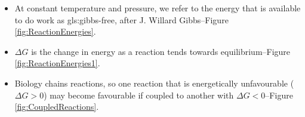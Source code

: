 \documentclass[]{article}
\begin{document}
\begin{itemize}

	\item At constant temperature and 	pressure, we refer 	to the energy that is available to do work as \gls{gls:gibbs-free}, after J. Willard Gibbs--Figure \ref{fig:ReactionEnergies}.
	
	\item $\Delta G$ is the change in energy as a reaction tends towards equilibrium--Figure \ref{fig:ReactionEnergies1}.
	
	\item Biology chains reactions, so one reaction that is energetically unfavourable ( $\Delta G > 0$) may become favourable if coupled to another with  $\Delta G < 0$--Figure \ref{fig:CoupledReactions}. 
\end{itemize}
\end{document}
